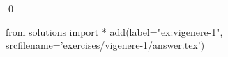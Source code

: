 
\begin{ex} 
  \label{ex:vigenere-1}
  
  \qed
\end{ex} 
\begin{python0}
from solutions import *
add(label="ex:vigenere-1",
    srcfilename='exercises/vigenere-1/answer.tex') 
\end{python0}
